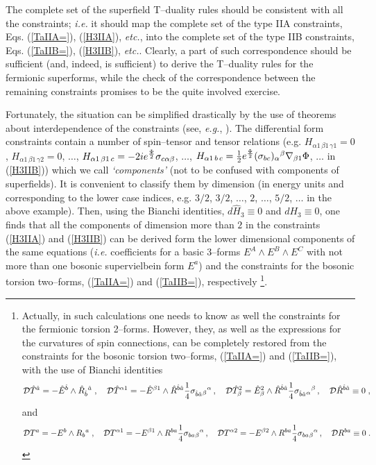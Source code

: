 \documentclass[a4paper,11pt]{article}
\begin{document}
The complete set of the superfield T--duality rules should be consistent 
with all the constraints; {\it i.e.} it should map 
the complete set of the type IIA constraints, 
Eqs. (\ref{TaIIA=}), (\ref{H3IIA}), 
{\it etc.}, into  the complete set of 
the 
type IIB constraints,  Eqs. (\ref{TaIIB=}), (\ref{H3IIB}), 
{\it etc.}. 
Clearly, a part of such correspondence should be 
sufficient (and, indeed, is sufficient) to derive  the 
T--duality rules for the fermionic superforms, while the check of the 
correspondence between the remaining constraints promises to be  
the quite  involved  exercise. 

Fortunately, the situation can be simplified drastically by the use of  
theorems about interdependence of the constraints 
(see, {\it e.g.}, \cite{AlgC,HW84,CGO87}). 
The differential form constraints contain a number of spin--tensor and tensor 
relations 
(e.g. $H_{\alpha 1\, \beta 1 \, \gamma 1}=0$, 
$H_{\alpha 1\, \beta 1 \, \gamma 2}=0$, $\ldots$, 
 $H_{\alpha 1\, \beta 1 \, c}= -2i e^{{\Phi\over 2}} \sigma_{c\alpha\beta}$, 
 $\ldots$, $H_{\alpha 1\, b \, c}= 
{1\over 2} e^{{\Phi\over 2}} (\sigma_{bc})_{\alpha}{}^{\beta} 
\nabla_{\beta 1}\Phi$, $\ldots$ in (\ref{H3IIB})) 
which we call {\sl `components'} 
(not to be confused with components of superfields). 
It is convenient to 
classify them by dimension (in energy units and corresponding to the 
lower case indices, e.g. $3/2$, $3/2$, $\ldots$, $2$, $\ldots$, $5/2$, 
$\ldots$ in the above example). Then, 
using the Bianchi identities, $d\hat{H}_3\equiv 0$ and $dH_3\equiv 0$,  
one finds \cite{HW84,CGO87}  that 
all the components of dimension more than $2$ in the constraints 
(\ref{H3IIA}) and (\ref{H3IIB}) can be derived form the lower dimensional 
components of the same equations 
({\it i.e.} coefficients for a basic 3--forms $E^A \wedge E^B\wedge E^C$  
with not more than 
one bosonic supervielbein form $E^a$) 
and the constraints for the 
bosonic torsion two--forms, 
(\ref{TaIIA=}) and (\ref{TaIIB=}), respectively
\footnote{ 
Actually, in such calculations one needs to know as well the constraints for  
the fermionic torsion 2--forms.  
However, they, as well as the expressions for 
the curvatures of spin connections, can be completely restored 
from the constraints for the bosonic torsion two--forms, 
(\ref{TaIIA=}) and (\ref{TaIIB=}), with the use of Bianchi identities  
$${\cal D}\hat{T}^{\hat{a}}= - \hat{E}^{\hat{b}} \wedge \hat{R}_{\hat{b}}{}^
{\hat{a}}\; , \quad  
{\cal D}\hat{T}^{\alpha 1}= - \hat{E}^{\beta 1} \wedge 
\hat{R}^{\hat{b}\hat{a}} {1\over 4} \sigma_{\hat{b}\hat{a}}{}_\beta{}^\alpha
\, , \quad  {\cal D}\hat{T}_{\beta}^2=  \hat{E}_{\beta}^2 \wedge 
\hat{R}^{\hat{b}\hat{a}} {1\over 4} \sigma_{\hat{b}\hat{a}}{}_\alpha{}^\beta 
\, , \quad 
 {\cal D} \hat{R}^{\hat{b}\hat{a}} \equiv 0 \; , $$ and 
$${\cal D}{T}^{{a}}= - {E}^{{b}} \wedge {R}_{{b}}{}^
{{a}}\; , \quad  
{\cal D}{T}^{\alpha 1}= - {E}^{\beta 1} \wedge 
{R}^{{b}{a}} {1\over 4} \sigma_{{b}{a}}{}_\beta{}^\alpha
\, , \quad  
{\cal D}{T}^{\alpha 2}= - {E}^{\beta 2} \wedge 
{R}^{{b}{a}} {1\over 4} \sigma_{{b}{a}}{}_\beta{}^\alpha
\, , \quad 
 {\cal D} {R}^{{b}{a}} \equiv 0 \; . $$ }.
\end{document}
